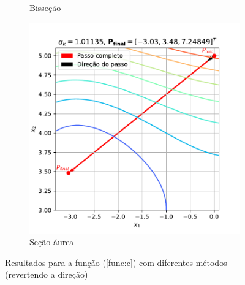 \documentclass[10pt, a4paper]{article}
\begin{document}
\begin{figure}
\begin{subfigure}[b]{0.32\textwidth}
      \caption{Bisseção}
      \label{fig:q2c2_2}
  \end{subfigure}
  \hfill
  \begin{subfigure}[b]{0.32\textwidth}
      \centering
      \includegraphics[width=\textwidth]{images/q2c2_3.pdf}
      \caption{Seção áurea}
      \label{fig:q2c2_3}
  \end{subfigure}
     \caption{Resultados para a função (\ref{func:c}) com diferentes métodos (revertendo a direção)}
     \label{fig:q2c2}
\end{figure}




\end{document}
